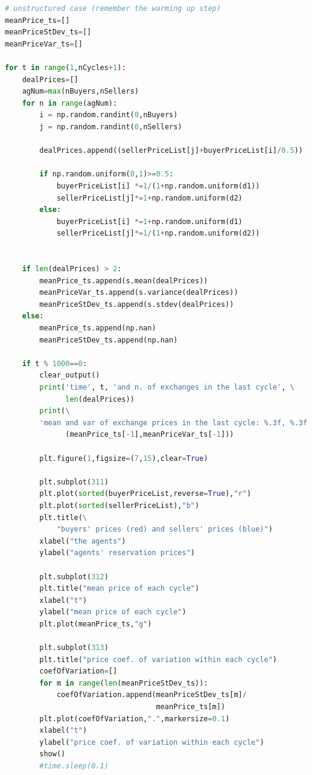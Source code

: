\documentclass[12pt]{report}
\begin{document}
\begin{lstlisting}[language=Python, caption=The unstructured version, basicstyle=\ttfamily\footnotesize]
# unstructured case (remember the warming up step)
meanPrice_ts=[]
meanPriceStDev_ts=[]
meanPriceVar_ts=[]

for t in range(1,nCycles+1):    
    dealPrices=[]
    agNum=max(nBuyers,nSellers)
    for n in range(agNum):
        i = np.random.randint(0,nBuyers)
        j = np.random.randint(0,nSellers)

        dealPrices.append((sellerPriceList[j]+buyerPriceList[i]/0.5))

        if np.random.uniform(0,1)>=0.5:    
            buyerPriceList[i] *=1/(1+np.random.uniform(d1))
            sellerPriceList[j]*=1+np.random.uniform(d2)
        else:
            buyerPriceList[i] *=1+np.random.uniform(d1)
            sellerPriceList[j]*=1/(1+np.random.uniform(d2))
        
           
    if len(dealPrices) > 2:
        meanPrice_ts.append(s.mean(dealPrices))
        meanPriceVar_ts.append(s.variance(dealPrices))
        meanPriceStDev_ts.append(s.stdev(dealPrices))
    else:
        meanPrice_ts.append(np.nan)
        meanPriceStDev_ts.append(np.nan)

    if t % 1000==0:
        clear_output()
        print('time', t, 'and n. of exchanges in the last cycle', \
              len(dealPrices))
        print(\
        'mean and var of exchange prices in the last cycle: %.3f, %.3f' %\
              (meanPrice_ts[-1],meanPriceVar_ts[-1]))

        plt.figure(1,figsize=(7,15),clear=True)

        plt.subplot(311)
        plt.plot(sorted(buyerPriceList,reverse=True),"r")
        plt.plot(sorted(sellerPriceList),"b")
        plt.title(\
            "buyers' prices (red) and sellers' prices (blue)")
        xlabel("the agents")
        ylabel("agents' reservation prices")

        plt.subplot(312)
        plt.title("mean price of each cycle")
        xlabel("t")
        ylabel("mean price of each cycle")
        plt.plot(meanPrice_ts,"g")
        
        plt.subplot(313)
        plt.title("price coef. of variation within each cycle")
        coefOfVariation=[]
        for m in range(len(meanPriceStDev_ts)):
            coefOfVariation.append(meanPriceStDev_ts[m]/
                                   meanPrice_ts[m])
        plt.plot(coefOfVariation,".",markersize=0.1)
        xlabel("t")
        ylabel("price coef. of variation within each cycle")
        show()
        #time.sleep(0.1)


\end{lstlisting}
\end{document}

